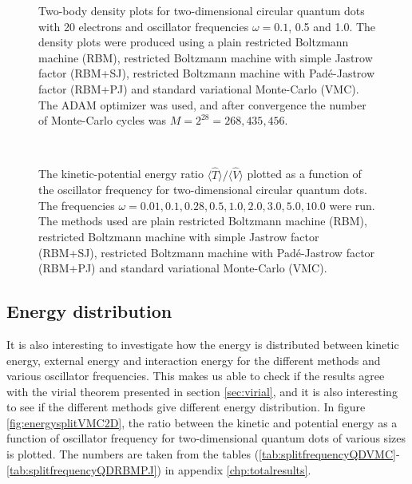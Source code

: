 {\begin{landscape}
\begin{figure}
		\caption{Two-body density plots for two-dimensional circular quantum dots with 20 electrons and oscillator frequencies $\omega=0.1$, 0.5 and 1.0. The density plots were produced using a plain restricted Boltzmann machine (RBM), restricted Boltzmann machine with simple Jastrow factor (RBM+SJ), restricted Boltzmann machine with Padé-Jastrow factor (RBM+PJ) and standard variational Monte-Carlo (VMC). The  ADAM optimizer was used, and after convergence the number of Monte-Carlo cycles was $M=2^{28}=268,435,456$.}%
		\label{fig:TB_interaction_20P}
	\end{figure}
\end{landscape}
}

\begin{figure}[H]
	\centering 
	\captionsetup[subfigure]{labelformat=empty}
	\subfloat[RBM]{{}}
	\subfloat[RBM+SJ]{{}}\\
	\subfloat[RBM+PJ]{{}}
	\subfloat[VMC]{{}}
	\caption{The kinetic-potential energy ratio $\langle\hat{T}\rangle/\langle\hat{V}\rangle$ plotted as a function of the oscillator frequency for two-dimensional circular quantum dots. The frequencies $\omega=0.01, 0.1, 0.28, 0.5, 1.0, 2.0, 3.0, 5.0, 10.0$ were run. The methods used are plain restricted Boltzmann machine (RBM), restricted Boltzmann machine with simple Jastrow factor (RBM+SJ), restricted Boltzmann machine with Padé-Jastrow factor (RBM+PJ) and standard variational Monte-Carlo (VMC).}
	\label{fig:energysplitVMC2D}
\end{figure}

\subsection{Energy distribution}
It is also interesting to investigate how the energy is distributed between kinetic energy, external energy and interaction energy for the different methods and various oscillator frequencies. This makes us able to check if the results agree with the virial theorem presented in section \ref{sec:virial}, and it is also interesting to see if the different methods give different energy distribution. In figure \eqref{fig:energysplitVMC2D}, the ratio between the kinetic and potential energy as a function of oscillator frequency for two-dimensional quantum dots of various sizes is plotted. The numbers are taken from the tables (\ref{tab:splitfrequencyQDVMC}-\ref{tab:splitfrequencyQDRBMPJ}) in appendix \ref{chp:totalresults}. 

